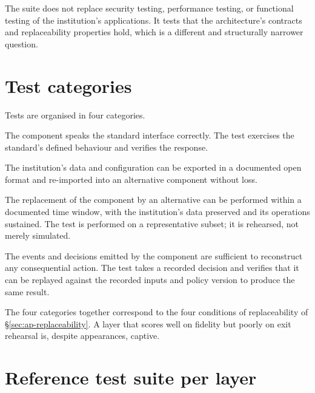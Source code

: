 The suite does not replace security testing, performance testing,
or functional testing of the institution's applications. It tests
that the architecture's contracts and replaceability properties
hold, which is a different and structurally narrower question.

\section{Test categories}
\label{sec:cf-categories}

Tests are organised in four categories.

\begin{description}[leftmargin=1.5em,style=nextline,nosep]
  \item[Interface fidelity.] The component speaks the standard
    interface correctly. The test exercises the standard's defined
    behaviour and verifies the response.
  \item[Data portability.] The institution's data and configuration
    can be exported in a documented open format and re-imported into
    an alternative component without loss.
  \item[Exit rehearsal.] The replacement of the component by an
    alternative can be performed within a documented time window,
    with the institution's data preserved and its operations
    sustained. The test is performed on a representative subset; it
    is rehearsed, not merely simulated.
  \item[Decision auditability.] The events and decisions emitted
    by the component are sufficient to reconstruct any consequential
    action. The test takes a recorded decision and verifies that it
    can be replayed against the recorded inputs and policy version
    to produce the same result.
\end{description}

\noindent The four categories together correspond to the four
conditions of replaceability of \S\ref{sec:ap-replaceability}. A layer that scores well on
fidelity but poorly on exit rehearsal is, despite appearances,
captive.

\section{Reference test suite per layer}
\label{sec:cf-suite}

